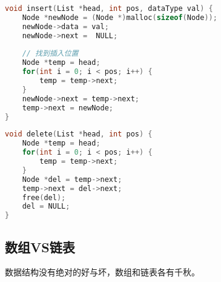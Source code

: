 
\begin{lstlisting}[language=C]
void insert(List *head, int pos, dataType val) {
    Node *newNode = (Node *)malloc(sizeof(Node));
    newNode->data = val;
    newNode->next =  NULL;
    
    // 找到插入位置
    Node *temp = head;
    for(int i = 0; i < pos; i++) {
        temp = temp->next;
    }
    newNode->next = temp->next;
    temp->next = newNode;
}
\end{lstlisting}

\vspace{0.5cm}


\begin{lstlisting}[language=C]
void delete(List *head, int pos) {
    Node *temp = head;
    for(int i = 0; i < pos; i++) {
        temp = temp->next;
    }
    Node *del = temp->next;
    temp->next = del->next;
    free(del);
    del = NULL;
}
\end{lstlisting}

\vspace{0.5cm}

\subsection{数组VS链表}

数据结构没有绝对的好与坏，数组和链表各有千秋。

\begin{table}[H]
	\centering
	\caption{数组VS链表}
\end{table}

